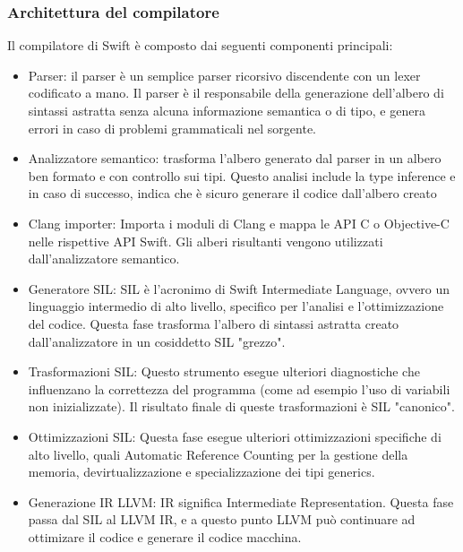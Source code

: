 \subsubsection{Architettura del compilatore}
Il compilatore di Swift è composto dai seguenti componenti principali:
\begin{itemize}
\item Parser: il parser è un semplice parser ricorsivo discendente con un lexer codificato a mano. Il parser è il responsabile della generazione dell'albero di sintassi astratta senza alcuna informazione semantica o di tipo, e genera errori in caso di problemi grammaticali nel sorgente.
\item Analizzatore semantico: trasforma l'albero generato dal parser in un albero ben formato e con controllo sui tipi. Questo analisi include la type inference e in caso di successo, indica che è sicuro generare il codice dall'albero creato
\item Clang importer: Importa i moduli di Clang e mappa le API C o Objective-C nelle rispettive API Swift. Gli alberi risultanti vengono utilizzati dall'analizzatore semantico.
\item Generatore SIL: SIL è l'acronimo di Swift Intermediate Language, ovvero un linguaggio intermedio di alto livello, specifico per l'analisi e l'ottimizzazione del codice. Questa fase trasforma l'albero di sintassi astratta creato dall'analizzatore in un cosiddetto SIL "grezzo".
\item Trasformazioni SIL: Questo strumento esegue ulteriori diagnostiche che influenzano la correttezza del programma (come ad esempio l'uso di variabili non inizializzate). Il risultato finale di queste trasformazioni è SIL "canonico".
\item Ottimizzazioni SIL: Questa fase esegue ulteriori ottimizzazioni specifiche di alto livello, quali Automatic Reference Counting per la gestione della memoria, devirtualizzazione e specializzazione dei tipi generics.
\item Generazione IR LLVM: IR significa Intermediate Representation. Questa fase passa dal SIL al LLVM IR, e a questo punto LLVM può continuare ad ottimizare il codice e generare il codice macchina.
\end{itemize}
